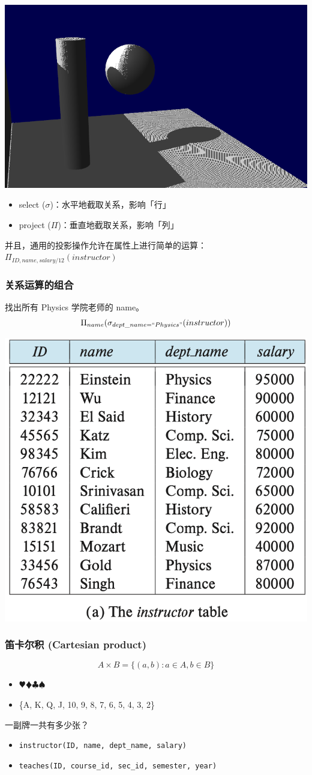 \documentclass[aspectratio=169, 14pt]{beamer}
\begin{document}
\begin{frame}
    \begin{center}
        \includegraphics[width=.45\textwidth]{image/project}
    \end{center}

\begin{itemize}
    \item select ($\sigma$)：\alert{水平地}截取关系，影响「行」
    \item project ($\Pi$)：\alert{垂直地}截取关系，影响「列」
\end{itemize}
\pause
并且，通用的投影操作允许在属性上进行简单的运算：\large{\(\Pi_{ID, name, salary/12}(instructor)\)}
    
\end{frame}

\begin{frame}
    \frametitle{关系运算的组合}
    找出所有 Physics 学院老师的 name。
    {\large \[\Pi_{name}(\sigma_{dept\_name=``Physics"}(instructor))\]}
    \begin{center}
        \includegraphics[width=.55\textwidth, trim={0 4.4cm 0 0},clip]{table/instructor} 
    \end{center}

\end{frame}

\begin{frame}
    \frametitle{笛卡尔积 (Cartesian product)}
\[A \times B = \{(a, b): a \in A, b \in B\}\]
\pause
\begin{itemize}
    \item $\varheart\vardiamond\clubsuit\spadesuit$
    \item \{A, K, Q, J, 10, 9, 8, 7, 6, 5, 4, 3, 2\}
\end{itemize}
{\large {}} 一副牌一共有多少张？

\pause
\begin{itemize}
    \item \texttt{instructor(ID, name, dept\_name, salary)}
    \item \texttt{teaches(ID, course\_id, sec\_id, semester, year)}
   \end{itemize} 
\end{frame}
\end{document}
